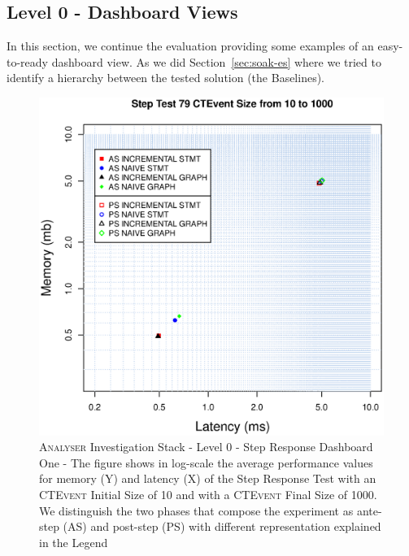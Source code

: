 \subsection{Level 0 - Dashboard Views}\label{sec:level0-step-dashboard}

In this section, we continue the evaluation providing some examples of an easy-to-ready dashboard view. As we did Section~\ref{sec:soak-es} where we tried to identify a hierarchy between the tested solution (the Baselines). 

\begin{figure}[htbp]
	\centering
	\includegraphics[width=\linewidth]{images/level-0-step-dashboard-1}	
	\caption[\textsc{Analyser} Investigation Stack - Level 0 - Step Response Dashboard One]{\textsc{Analyser} Investigation Stack - Level 0 - Step Response Dashboard One - The figure shows in log-scale the average performance values for memory (Y) and latency (X) of the Step Response Test with an \textsc{CTEvent} Initial Size of 10 and with a \textsc{CTEvent} Final Size of 1000. We distinguish the two phases that compose the experiment as ante-step (AS) and post-step (PS) with different representation explained in the Legend}
	\label{fig:level-0-step-dashboard-1}
\end{figure}
